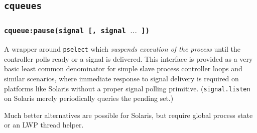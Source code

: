 \documentclass[11pt, oneside]{memoir}
\newcommand*{\cqueues}[0]{\texttt{cqueues}\xspace}
\newcommand*{\syscall}[1]{\texttt{#1}\xspace}
\newcommand*{\routine}[1]{\texttt{#1}\xspace}
\newcounter{toccols}
\newenvironment{Module}[1]{
	\subsection{\texttt{#1}}
	\addtocontents{toc}{
		\protect\begin{multicols}{\value{toccols}}
	}
}{
	\addtocontents{toc}{\protect\end{multicols}}
}
\begin{document}
\begin{Module}{\cqueues}
\subsubsection[\routine{cqueues:pause}]{\routine{cqueue:pause(signal [, signal $\ldots$ ])}}
A wrapper around \syscall{pselect} which \emph{suspends execution of the process} until the controller polls ready or a signal is delivered. This interface is provided as a very basic least common denominator for simple slave process controller loops and similar scenarios, where immediate response to signal delivery is required on platforms like Solaris without a proper signal polling primitive. (\routine{signal.listen} on Solaris merely periodically queries the pending set.)

Much better alternatives are possible for Solaris, but require global process state or an LWP thread helper.

\end{Module}
\end{document}
